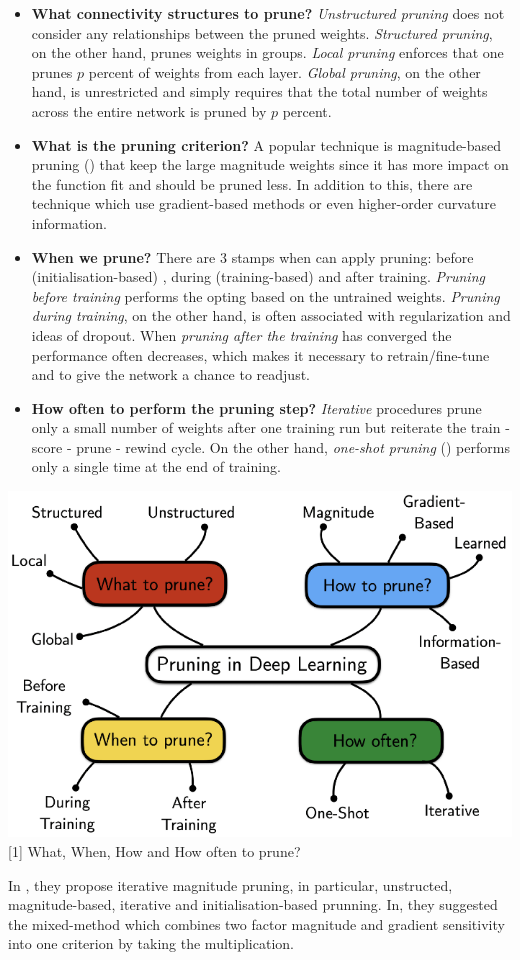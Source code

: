 \documentclass{article}
\theoremstyle{theorem}
\theoremstyle{definition}
\begin{document}
	\begin{itemize}
		\item \textbf{What connectivity structures to prune?}
		\textit{ Unstructured pruning} does not consider any relationships between the pruned weights. \textit{Structured pruning}, on the other hand, prunes weights in groups. \textit{Local pruning} enforces that one prunes $p
		 $ percent of weights from each layer. \textit{Global pruning}, on the other hand, is unrestricted and simply requires that the total number of weights across the entire network is pruned by $p$ percent.
		\item \textbf{What is the pruning criterion?} A popular technique is magnitude-based pruning (\cite{cite2}) that keep the large magnitude weights since it has more impact on the function fit and should be pruned less. In addition to this, there are technique which use gradient-based methods or even higher-order curvature information.
		\item \textbf{When we prune?} There are 3 stamps when can apply pruning: before (initialisation-based) , during (training-based) and after training.  \textit{Pruning before training} performs the opting based on the untrained weights. \textit{Pruning during training}, on the other hand, is often associated with regularization and ideas of dropout. When \textit{pruning after the training} has converged the performance often decreases, which makes it necessary to retrain/fine-tune and to give the network a chance to readjust. 
		\item \textbf{How often to perform the pruning step?} \textit{Iterative} procedures prune only a small number of weights after one training run but reiterate the train - score - prune - rewind cycle. On the other hand, \textit{one-shot pruning} (\cite{cite6}) performs only a single time at the end of training.
	\end{itemize}
 
\begin{center}
	\includegraphics[scale=0.3]{overall}\\
	\figurename[1]{ What, When, How and How often to prune?}
\end{center}
In \cite{cite3}, they propose iterative magnitude pruning, in particular, unstructed, magnitude-based, iterative and initialisation-based prunning. In\cite{cite5}, they suggested the mixed-method which combines two factor magnitude and gradient sensitivity into one criterion by taking the multiplication.
\end{document}
